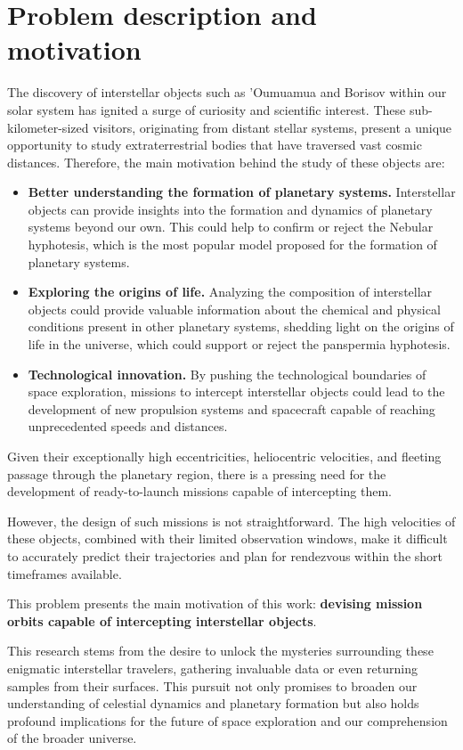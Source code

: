 \section{Problem description and motivation}

The discovery of interstellar objects such as 'Oumuamua and Borisov within our
solar system has ignited a surge of curiosity and scientific interest. These
sub-kilometer-sized visitors, originating from distant stellar systems, present
a unique opportunity to study extraterrestrial bodies that have traversed vast
cosmic distances. Therefore, the main motivation behind the study of these
objects are:

\begin{itemize}

  \item \textbf{Better understanding the formation of planetary systems.}
        Interstellar objects can provide insights into the formation and
        dynamics of planetary systems beyond our own. This could help to
        confirm or reject the Nebular hyphotesis, which is the most popular
        model proposed for the formation of planetary systems.

  \item \textbf{Exploring the origins of life.} Analyzing the composition of
        interstellar objects could provide valuable information about the
        chemical and physical conditions present in other planetary
        systems, shedding light on the origins of life in the universe, which
        could support or reject the panspermia hyphotesis.

  \item \textbf{Technological innovation.} By pushing the technological
        boundaries of space exploration, missions to intercept interstellar
        objects could lead to the development of new propulsion systems and
        spacecraft capable of reaching unprecedented speeds and distances.

\end{itemize}

Given their exceptionally high eccentricities, heliocentric velocities, and
fleeting passage through the planetary region, there is a pressing need for the
development of ready-to-launch missions capable of intercepting them.

However, the design of such missions is not straightforward. The high velocities
of these objects, combined with their limited observation windows, make it
difficult to accurately predict their trajectories and plan for rendezvous
within the short timeframes available.

This problem presents the main motivation of this work: \textbf{devising mission
orbits capable of intercepting interstellar objects}.

This research stems from the desire to unlock the mysteries surrounding these
enigmatic interstellar travelers, gathering invaluable data or even returning
samples from their surfaces. This pursuit not only promises to broaden our
understanding of celestial dynamics and planetary formation but also holds
profound implications for the future of space exploration and our comprehension
of the broader universe.
